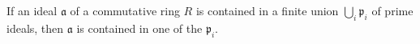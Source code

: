 If an ideal $\mathfrak{a}$ of a commutative ring $R$ is contained in a finite union $\bigcup_i \mathfrak{p}_i$ of prime ideals, then $\mathfrak{a}$ is contained in one of the $\mathfrak{p}_i$.
